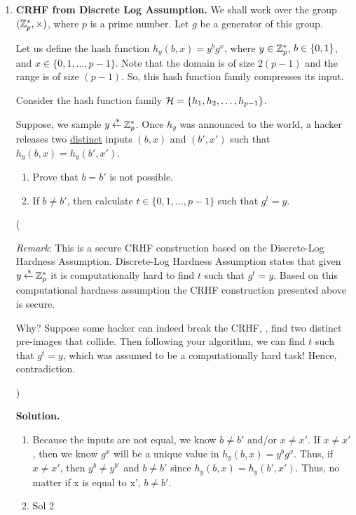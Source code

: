 \documentclass[11pt]{article}
\newcommand{\nextoddpage}{\checkoddpage\ifoddpage{\ \newpage\ \newpage}\else{\ \newpage}\fi}
\begin{document}
\begin{enumerate}
\nextoddpage 
\item {\bfseries CRHF from Discrete Log Assumption.} 
  We shall work over the group $({\mathbb Z}_p^*,\times)$, where $p$ is a prime number. 
  Let $g$ be a generator of this group. 
  
  Let us define the hash function $h_y (b,x) = y^b g^x$, where $y\in{\mathbb Z}_p^*$, $b\in{\{0,1\}}$, and $x\in\{0,1,\dotsc,p-1\}$. 
  Note that the domain is of size $2(p-1)$ and the range is of size $(p-1)$. 
  So, this hash function family compresses its input. 
  
  Consider the hash function family ${\mathcal H} = \{h_1,h_2,\dotsc,h_{p-1}\}$. 
  
  Suppose, we sample $y\mathbin{\stackrel{\mbox{\,\tiny \$}}{\gets}}{\mathbb Z}_p^*$.
  Once $h_y$ was announced to the world, a hacker releases two \underline{distinct} inputs $(b,x)$ and $(b',x')$ such that $h_y(b,x)=h_y(b',x')$. 
  
  \begin{enumerate}
  \item Prove that $b=b'$ is not possible. 
  \item If $b\neq b'$, then calculate $t\in\{0,1,\dotsc,p-1\}$ such that $g^t=y$. 
  \end{enumerate}
  
  ({\footnotesize{\em Remark}: This is a secure CRHF construction based on the Discrete-Log Hardness Assumption. Discrete-Log Hardness Assumption states that given $y\mathbin{\stackrel{\mbox{\,\tiny \$}}{\gets}}{\mathbb Z}_p^*$ it is computationally hard to find $t$ such that $g^t=y$. Based on this computational hardness assumption the CRHF construction presented above is secure. 
  
  Why? Suppose some hacker can indeed break the CRHF, \ie, find two distinct pre-images that collide. Then following your algorithm, we can find $t$ such that $g^t=y$, which was assumed to be a computationally hard task! Hence, contradiction.}) 

  {\bfseries Solution.} 
  \begin{enumerate}
  \item Because the inputs are not equal, we know $b \neq b'$ and/or $x \neq x'$. If $x \neq x'$, then we know $g^x$ will be a unique value in $h_y (b,x) = y^b g^x$. Thus, if $x \neq x'$, then $y^b \neq y^{b'}$ and $b \neq b'$ since $h_y(b,x) = h_y(b',x')$. Thus, no matter if x is equal to x', $b \neq b'$.
  \item Sol 2 
  \end{enumerate}

 
 



\end{enumerate}
\end{document}
